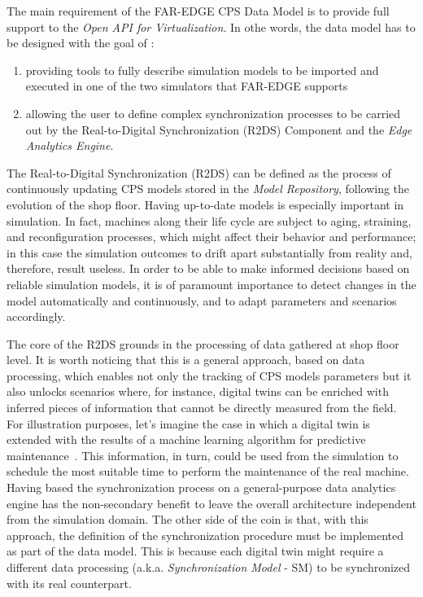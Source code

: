 The main requirement of the FAR-EDGE CPS Data Model is to provide full support to the \textit{Open API for Virtualization}. 
In othe words, the data model has to be designed with the goal of : 
\begin{enumerate}
\item providing tools to fully describe simulation models to be imported and executed in one of the two simulators that FAR-EDGE supports
\item allowing the user to define complex synchronization processes to be carried out by the Real-to-Digital Synchronization (R2DS) Component and the \textit{Edge Analytics Engine}. 
\end{enumerate}

The Real-to-Digital Synchronization (R2DS) can be defined as the process of continuously updating CPS models stored in the \textit{Model Repository}, following the evolution of the shop floor. 
Having up-to-date models is especially important in simulation. 
In fact, machines along their life cycle are subject to aging, straining, and reconfiguration processes, which might affect their behavior and performance; in this case the simulation outcomes to drift apart substantially from reality and, therefore, result useless. 
In order to be able to make informed decisions based on reliable simulation models, it is of paramount importance to detect changes in the model automatically and continuously, and to adapt parameters and scenarios accordingly. 

The core of the R2DS grounds in the processing of data gathered at shop floor level. 
It is worth noticing that this is a general approach, based on data processing, which enables not only the tracking of CPS models parameters but it also unlocks scenarios where, for instance, digital twins can be enriched with inferred pieces of information that cannot be directly measured from the field. 
For illustration purposes, let's imagine the case in which a digital twin is extended with the results of a machine learning algorithm for predictive maintenance~\cite{daily2017predictive}. This information, in turn, could be used from the simulation to schedule the most suitable time to perform the maintenance of the real machine.  
Having based the synchronization process on a general-purpose data analytics engine has the non-secondary benefit to leave the overall architecture independent from the simulation domain. The other side of the coin is that, with this approach, the definition of the synchronization procedure must be implemented as part of the data model. 
This is because each digital twin might require a different data processing (a.k.a. \textit{Synchronization Model} - SM) to be synchronized with its real counterpart. 

